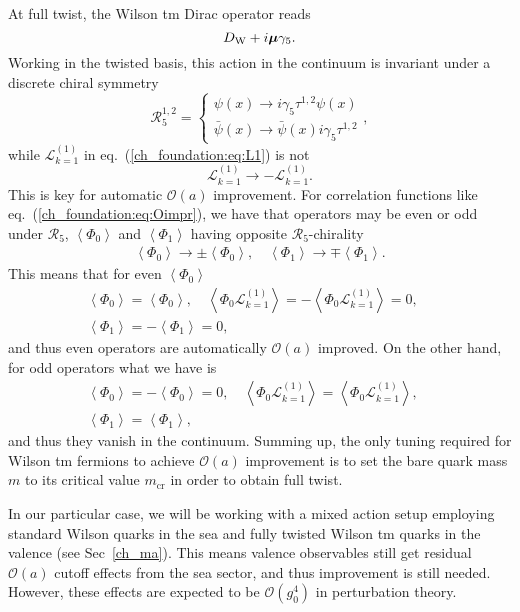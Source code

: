 At full twist, the Wilson tm Dirac operator reads
\begin{equation}
D_{\textrm W}+i\boldsymbol{\mu}\gamma_5.
\end{equation}
Working in the twisted basis, this action in the continuum is invariant under a discrete chiral symmetry 
\begin{equation}
\mathcal{R}_5^{1,2}=\left\{\begin{matrix}
\psi(x)\rightarrow i\gamma_5\tau^{1,2}\psi(x) \\ 
\bar{\psi}(x)\rightarrow \bar{\psi}(x)i\gamma_5\tau^{1,2}
\end{matrix}\right.,
\end{equation}
while $\mathcal{L}_{k=1}^{(1)}$ in eq.~(\ref{ch_foundation:eq:L1}) is not 
\begin{equation}
\mathcal{L}_{k=1}^{(1)}\rightarrow-\mathcal{L}_{k=1}^{(1)}.
\end{equation}
This is key for automatic $\mathcal{O}(a)$ improvement. For correlation functions like eq.~(\ref{ch_foundation:eq:Oimpr}), we have that operators may be even or odd under $\mathcal{R}_5$, $\left<\Phi_0\right>$ and $\left<\Phi_1\right>$ having opposite $\mathcal{R}_5$-chirality
\begin{gather}
\left<\Phi_0\right>\rightarrow\pm\left<\Phi_0\right>, \quad \left<\Phi_1\right>\rightarrow\mp\left<\Phi_1\right>.
\end{gather}
This means that for even $\left<\Phi_0\right>$
\begin{gather}
\left<\Phi_0\right>=\left<\Phi_0\right>,
\quad \left<\Phi_0\mathcal{L}^{(1)}_{k=1}\right>=-\left<\Phi_0\mathcal{L}^{(1)}_{k=1}\right>=0, \quad \\ \left<\Phi_1\right>=-\left<\Phi_1\right>=0,
\end{gather}
and thus even operators are automatically $\mathcal{O}(a)$ improved. On the other hand, for odd operators what we have is
\begin{gather}
\left<\Phi_0\right>=-\left<\Phi_0\right>=0, \quad
\left<\Phi_0\mathcal{L}^{(1)}_{k=1}\right>=\left<\Phi_0\mathcal{L}^{(1)}_{k=1}\right>, \quad \\ \left<\Phi_1\right>=\left<\Phi_1\right>,
\end{gather}
and thus they vanish in the continuum. Summing up, the only tuning required for Wilson tm fermions to achieve $\mathcal{O}(a)$ improvement is to set the bare quark mass $m$ to its critical value $m_{\textrm{cr}}$ in order to obtain full twist.

In our particular case, we will be working with a mixed action setup employing standard Wilson quarks in the sea and fully twisted Wilson tm quarks in the valence (see Sec~\ref{ch_ma}). This means valence observables still get residual $\mathcal{O}(a)$ cutoff effects from the sea sector, and thus improvement is still needed. However, these effects are expected to be $\mathcal{O}(g_0^4)$ in perturbation theory.

